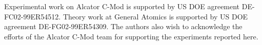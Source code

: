 \documentclass[12pt,floatfix,showpacs]{revtex4-1}
\begin{document}

\begin{acknowledgments}
 Experimental work on Alcator C-Mod is supported by US DOE agreement DE-FC02-99ER54512. Theory work at General Atomics is supported by US DOE agreement DE-FG02-99ER54309.  The authors also wish to acknowledge the efforts of the Alcator C-Mod team for supporting the experiments reported here.
\end{acknowledgments}



\end{document}
